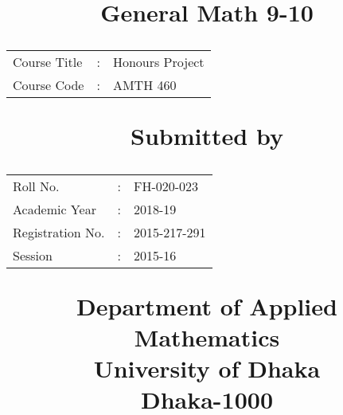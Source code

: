 \title{%
	{\bf\Or\Huge\vspace{-2cm} General Math 9-10}\\[10ex]
	\if
	{\Large
		\begin{minipage}{0.8\textwidth}
			\centering			
			\begin{tabular}{p{3.7cm}cp{3.8cm}}
				Course Title& :&\hspace{.15cm}  Honours Project\\[-1ex]
				Course Code & :&\hspace{.15cm} AMTH 460\\[4ex]
			\end{tabular}
			
			{\bfseries\Large Submitted by\\[1ex]}
			\begin{tabular}{p{3.7cm}cp{3.8cm}}
				Roll No.& :& \hspace{.15cm} FH-020-023\\[-1ex]
				Academic Year&:&\hspace{.15cm} 2018-19\\[-1ex]
				Registration No.&:&\hspace{.15cm} 2015-217-291\\[-1ex]
				Session & :& \hspace{.15cm} 2015-16\\[10ex]
			\end{tabular}
			
		\end{minipage}
		
	}
	\fi
	
	{\bf\Large Department of Applied Mathematics\\[-.5ex]
		University of Dhaka\\[-.8ex]
		Dhaka-1000}
}

\date{}%
\usepackage{fancyhdr}
\usepackage{lipsum}

\makeatletter
\def\headrule{{
		\if@fancyplain\let\headrulewidth\plainheadrulewidth\fi
		\vskip 0pt%
		\hrule\@height\headrulewidth\@width\headwidth   
		\vskip-\headrulewidth%
}}
\makeatother

\pagestyle{fancy}
